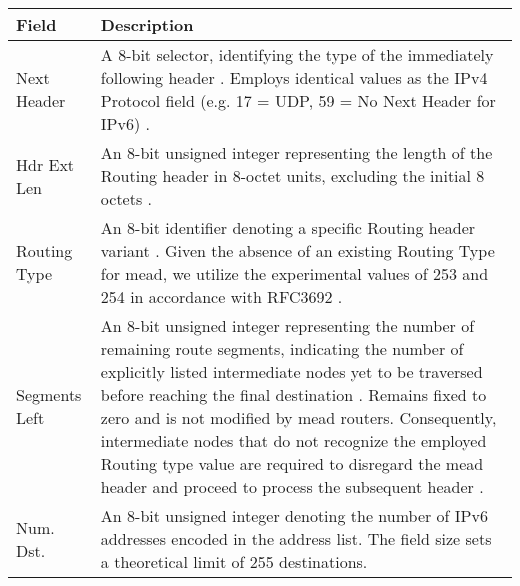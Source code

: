 \bgroup
\begin{table}[!htbp]
\centering
\def\arraystretch{1.35}%
\setlength{\tabcolsep}{1.2em}
\begin{tabularx}{\textwidth}{lX}
\toprule
\textbf{Field}& \textbf{Description} \\
\midrule
Next Header   & A 8-bit selector, identifying the type of the immediately
                following header \cite{rfc8200_ipv6_hdr}.
                Employs identical values as the IPv4 Protocol field (e.g. 17 =
                UDP, 59 = No Next Header for IPv6)
                \cite{iana_prot_nums}.\\
Hdr Ext Len   & An 8-bit unsigned integer representing the length of the
                Routing header in 8-octet units, excluding the initial 8
                octets \cite{rfc8200_ipv6_hdr}. \\
Routing Type  & An 8-bit identifier denoting a specific Routing header variant
                \cite{rfc8200_ipv6_hdr}.
                Given the absence of an existing Routing Type for \gls{mead}, we
                utilize the experimental values of 253 and 254 in accordance
                with RFC3692 \cite{rfc3692_ipv6_rt_type}.\\
Segments Left & An 8-bit unsigned integer representing the number of remaining
                route segments, indicating the number of explicitly listed
                intermediate nodes yet to be traversed before reaching the
                final destination \cite{rfc8200_ipv6_hdr}.
                Remains fixed to zero and is not modified by \gls{mead} routers.
                Consequently, intermediate nodes that do not recognize the
                employed Routing type value are required to disregard the
                \gls{mead} header and proceed to process the subsequent header
                \cite{rfc8200_ipv6_hdr}.\\
Num. Dst.     & An 8-bit unsigned integer denoting the number of IPv6
                addresses encoded in the address list.
                The field size sets a theoretical limit of 255 destinations.\\

\end{tabularx}
\end{table}
